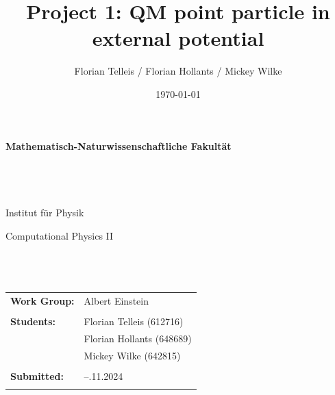 \documentclass[11pt, letterpaper, onecolumn]{article}
\title{Project 1: QM point particle in external potential}
\author{Florian Telleis / Florian Hollants / Mickey Wilke}
\date{\today}
\begin{document}
	
	\begin{titlepage}
		\thispagestyle{empty}
		\begin{figure}
			
		\end{figure}
		\vspace*{-43mm}\hspace{-6mm}\textbf{\textcolor{pantone294}{\large{Mathematisch-Naturwissenschaftliche Fakultät}}}\\\\\\\\\\
		\textcolor{pantone294}{Institut für Physik}\\
		\vspace{30mm}
		\begin{center}
			\textcolor{pantone294}{\huge{Computational Physics II}}\\\vspace*{7mm}
			\textcolor{pantone294}{\huge{\textbf{\thetitle}}}\\\vspace*{10mm}
			\textcolor{pantone294}{\theauthor}\\\vspace*{10mm}
			\textcolor{pantone294}{\thedate}\\\vspace*{20mm}
			\begin{tabular}{ll}
				\textbf{Work Group:} & Albert Einstein	 \\ \\
				\textbf{Students:} & Florian Telleis (612716) \\
									& Florian Hollants (648689)\\
									& Mickey  Wilke (642815)\\ \\
				\textbf{Submitted:} & --.11.2024 \\ \\				
			\end{tabular}
		\end{center}
	\end{titlepage}
	\makeatother
	\restoregeometry
		
		\newpage
	
	
	
	
	
	
    \tableofcontents
    \vspace{1cm}
    
\end{document}

